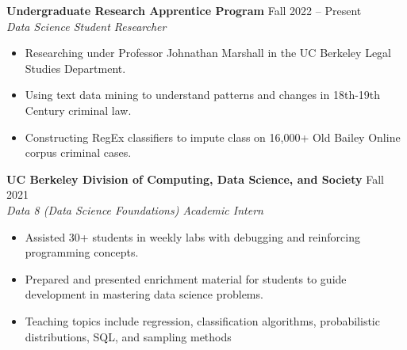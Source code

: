 \documentclass{article}
\begin{document}
    \begin{adjustwidth}{1em}{1em}


        \textbf{Undergraduate Research Apprentice Program} \hfill Fall 2022 -- Present
        \\ \textit{Data Science Student Researcher}
        \begin{itemize}
            \item Researching under Professor Johnathan Marshall in the UC Berkeley Legal Studies Department.
            \item Using text data mining to understand patterns and changes in 18th-19th Century criminal law.
            \item Constructing RegEx classifiers to impute class on 16,000+ Old Bailey Online corpus criminal cases.
        \end{itemize}

        \vspace{1mm}

        \textbf{UC Berkeley Division of Computing, Data Science, and Society} \hfill Fall 2021
        \\ \textit{Data 8 (Data Science Foundations) Academic Intern}
        \begin{itemize}
            \item Assisted 30+ students in weekly labs with debugging and reinforcing programming concepts.
            \item Prepared and presented enrichment material for students to guide development in mastering data science problems.
            \item Teaching topics include regression, classification algorithms, probabilistic distributions, SQL, and sampling methods

        \end{itemize}

        

        
    \end{adjustwidth}

    

\end{document}
